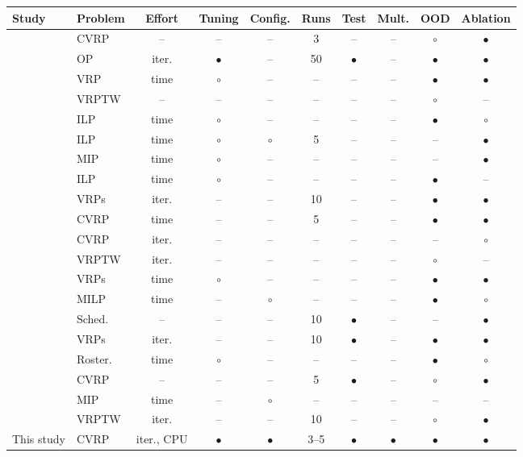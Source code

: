 \begin{tabular}{llcccccccc}
\toprule
Study & Problem & Effort & Tuning & Config. & Runs & Test & Mult. & OOD & Ablation \\
\midrule
\citet{hottung2020neural} & CVRP & -- & -- & -- & 3 & -- & -- & $\circ$ & $\bullet$ \\
\citet{reijnen2024online} & OP & iter. & $\bullet$ & -- & 50 & $\bullet$ & -- & $\bullet$ & $\bullet$ \\
\citet{zhou2023agh} & VRP & time & $\circ$ & -- & -- & -- & -- & $\bullet$ & $\bullet$ \\
\citet{falkner2022nch} & VRPTW & -- & -- & -- & -- & -- & -- & $\circ$ & -- \\
\citet{wu2021lnsip} & ILP & time & $\circ$ & -- & -- & -- & -- & $\bullet$ & $\circ$ \\
\citet{song2020lns} & ILP & time & $\circ$ & $\circ$ & 5 & -- & -- & -- & $\bullet$ \\
\citet{sonnerat2021mip} & MIP & time & $\circ$ & -- & -- & -- & -- & -- & $\bullet$ \\
\citet{huang2023cllns} & ILP & time & $\circ$ & -- & -- & -- & -- & $\bullet$ & -- \\
\citet{johnn2023graph} & VRPs & iter. & -- & -- & 10 & -- & -- & $\bullet$ & $\bullet$ \\
\citet{li2021delegate} & CVRP & time & -- & -- & 5 & -- & -- & $\bullet$ & $\bullet$ \\
\citet{gao2020design} & CVRP & iter. & -- & -- & -- & -- & -- & -- & $\circ$ \\
\citet{chen2020dpr} & VRPTW & iter. & -- & -- & -- & -- & -- & $\circ$ & -- \\
\citet{hottung2025nds} & VRPs & time & $\circ$ & -- & -- & -- & -- & $\bullet$ & $\bullet$ \\
\citet{liu2022lb} & MILP & time & -- & $\circ$ & -- & -- & -- & $\bullet$ & $\circ$ \\
\citet{li2024qalns} & Sched. & -- & -- & -- & 10 & $\bullet$ & -- & -- & $\bullet$ \\
\citet{yu2026dac} & VRPs & iter. & -- & -- & 10 & $\bullet$ & -- & $\bullet$ & $\bullet$ \\
\citet{oberweger2022srrp} & Roster. & time & $\circ$ & -- & -- & -- & -- & $\bullet$ & $\circ$ \\
\citet{herdianto2025node} & CVRP & -- & -- & -- & 5 & $\bullet$ & -- & $\circ$ & $\bullet$ \\
\citet{cai2025balans} & MIP & time & -- & $\circ$ & -- & -- & -- & -- & -- \\
\citet{feijen2024lens} & VRPTW & iter. & -- & -- & 10 & -- & -- & $\circ$ & $\bullet$ \\
This study & CVRP & iter., CPU & $\bullet$ & $\bullet$ & 3--5 & $\bullet$ & $\bullet$ & $\bullet$ & $\bullet$ \\
\bottomrule
\end{tabular}
